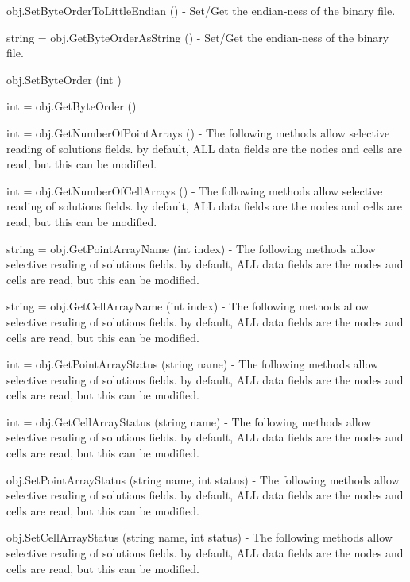 \begin{DoxyItemize}
\item {\ttfamily obj.\-Set\-Byte\-Order\-To\-Little\-Endian ()} -\/ Set/\-Get the endian-\/ness of the binary file.  
\item {\ttfamily string = obj.\-Get\-Byte\-Order\-As\-String ()} -\/ Set/\-Get the endian-\/ness of the binary file.  
\item {\ttfamily obj.\-Set\-Byte\-Order (int )}  
\item {\ttfamily int = obj.\-Get\-Byte\-Order ()}  
\item {\ttfamily int = obj.\-Get\-Number\-Of\-Point\-Arrays ()} -\/ The following methods allow selective reading of solutions fields. by default, A\-L\-L data fields are the nodes and cells are read, but this can be modified.  
\item {\ttfamily int = obj.\-Get\-Number\-Of\-Cell\-Arrays ()} -\/ The following methods allow selective reading of solutions fields. by default, A\-L\-L data fields are the nodes and cells are read, but this can be modified.  
\item {\ttfamily string = obj.\-Get\-Point\-Array\-Name (int index)} -\/ The following methods allow selective reading of solutions fields. by default, A\-L\-L data fields are the nodes and cells are read, but this can be modified.  
\item {\ttfamily string = obj.\-Get\-Cell\-Array\-Name (int index)} -\/ The following methods allow selective reading of solutions fields. by default, A\-L\-L data fields are the nodes and cells are read, but this can be modified.  
\item {\ttfamily int = obj.\-Get\-Point\-Array\-Status (string name)} -\/ The following methods allow selective reading of solutions fields. by default, A\-L\-L data fields are the nodes and cells are read, but this can be modified.  
\item {\ttfamily int = obj.\-Get\-Cell\-Array\-Status (string name)} -\/ The following methods allow selective reading of solutions fields. by default, A\-L\-L data fields are the nodes and cells are read, but this can be modified.  
\item {\ttfamily obj.\-Set\-Point\-Array\-Status (string name, int status)} -\/ The following methods allow selective reading of solutions fields. by default, A\-L\-L data fields are the nodes and cells are read, but this can be modified.  
\item {\ttfamily obj.\-Set\-Cell\-Array\-Status (string name, int status)} -\/ The following methods allow selective reading of solutions fields. by default, A\-L\-L data fields are the nodes and cells are read, but this can be modified.  

\end{DoxyItemize}

